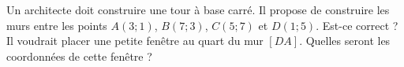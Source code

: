 
\begin{exercice}\label{exosmath-0574}

    Un architecte doit construire une tour à base carré. Il propose de construire les murs entre les points \( A(3;1)\), \( B(7;3)\), \( C(5;7)\) et \( D(1;5)\). Est-ce correct ? Il voudrait placer une petite fenêtre au quart du mur \( [DA]\). Quelles seront les coordonnées de cette fenêtre ?

\end{exercice}
